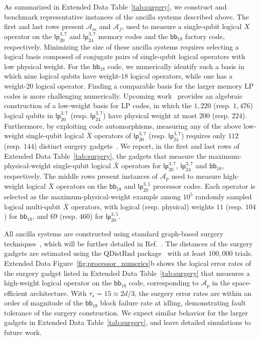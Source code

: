 \documentclass[reprint,twocolumn,secnumarabic,amssymb, aps, prx]{revtex4-2}
\newcommand{\bb}{\mbox{$\mathsf{bb}_{18}$}}
\newcommand{\lpmemlarge}{\mbox{$\mathsf{lp}_{24}^{3, 7}$}}
\newcommand{\lpmemmed}{\mbox{$\mathsf{lp}^{3, 7}_{20}$}}
\newcommand{\lpproc}{\mbox{$\mathsf{lp}^{3, 5}_{20}$}}
\newcommand{\Aproc}{\mathcal{A}_p}
\newcommand{\Am}{\mathcal{A}_m}
\newcommand{\Af}{\mathcal{A}_f}
\newcommand{\taus}{\tau_s}
\begin{document}
As summarized in Extended Data Table~\ref{tab:surgery}, we construct and benchmark representative instances of the ancilla systems described above. The first and last rows present $\Am$ and $\Af$, used to measure a single-qubit logical $X$ operator on the $\lpmemmed$ and $\lpmemlarge$  memory codes and the $\bb$ factory code, respectively. Minimizing the size of these ancilla systems requires selecting a logical basis composed of conjugate pairs of single-qubit logical operators with low physical weight. For the $\bb$ code, we numerically identify such a basis in which nine logical qubits have weight-$18$ logical operators, while one has a weight-$20$ logical operator. Finding a comparable basis for the larger memory LP codes is more challenging numerically. Upcoming work~\cite{zheng2026high} provides an algebraic construction of a low-weight basis for LP codes, in which the $1{,}220$ (resp. $1{,}476$) logical qubits in $\lpmemmed$ (resp. $\lpmemlarge$) have physical weight at most $200$ (resp. $224$). Furthermore, by exploiting code automorphisms, measuring any of the above low-weight single-qubit logical $\bar{X}$ operators of $\lpmemmed$ (resp. $\lpmemlarge$) requires only $112$ (resp. $144$) distinct surgery gadgets~\cite{zheng2026high}. We report, in the first and last rows of Extended Data Table~\ref{tab:surgery}, the gadgets that measure the maximum-physical-weight single-qubit logical $\bar{X}$ operators for $\lpmemmed$, $\lpmemlarge$ and $\bb$, respectively. The middle rows present instances of $\Aproc$ used to measure high-weight logical $\bar{X}$ operators on the $\bb$ and $\lpproc$ processor codes. Each operator is selected as the maximum-physical-weight example among $10^5$ randomly sampled logical multi-qubit $\bar{X}$ operators, with logical (resp. physical) weights $11$ (resp. $104$) for $\bb$, and $69$ (resp. $460$) for $\lpproc$.

All ancilla systems are constructed using standard graph-based surgery techniques~\cite{cross2024improved, williamson2024low}, which will be further detailed in Ref.~\cite{zheng2026high}. The distances of the surgery gadgets are estimated using the QDistRnd package~\cite{pryadko2023qdistrnd} with at least $100{,}000$ trials. Extended Data Figure~\ref{fig:processor_numerics}b shows the logical error rates of the surgery gadget listed in Extended Data Table~\ref{tab:surgery} that measures a high-weight logical operator on the $\bb$ code, corresponding to $\Aproc$ in the space-efficient architecture. With $\taus = 15 \approx 2d/3$, the surgery error rates are within an order of magnitude of the $\bb$ block failure rate at idling, demonstrating fault tolerance of the surgery construction. We expect similar behavior for the larger gadgets in Extended Data Table~\ref{tab:surgery}, and leave detailed simulations to future work.
\end{document}
